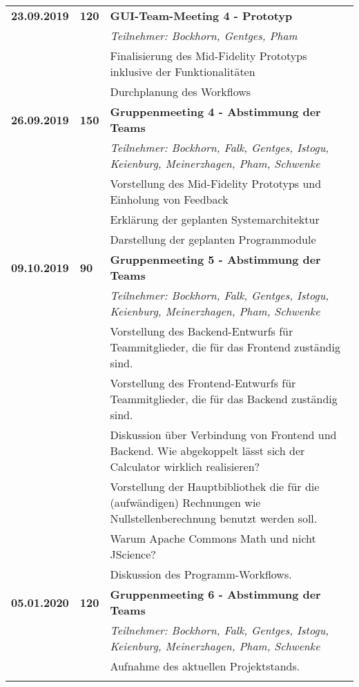 {\begin{longtable}{|l|l|p{11cm}|}
	\\\hline
		\textbf{23.09.2019} 
			& \textbf{\hfill120} & \textbf{GUI-Team-Meeting 4 - Prototyp} 
			\\ & &
			\small{\textit{Teilnehmer: Bockhorn, Gentges, Pham}}
			\\ & &
			Finalisierung des Mid-Fidelity Prototyps inklusive der Funktionalitäten
			\\ & &
			Durchplanung des Workflows			
	\\\hline
		\textbf{26.09.2019} 
			& \textbf{\hfill150} & \textbf{Gruppenmeeting 4 - Abstimmung der Teams}
			\\ & &
			\small{\textit{Teilnehmer: Bockhorn, Falk, Gentges, Istogu, Keienburg, Meinerzhagen, Pham, Schwenke}}
			\\ & &
			Vorstellung des Mid-Fidelity Prototyps und Einholung von Feedback
			\\ & &
			Erklärung der geplanten Systemarchitektur
			\\ & &
			Darstellung der geplanten Programmodule			
	\\\hline
		\textbf{09.10.2019} 
			& \textbf{\hfill90} & \textbf{Gruppenmeeting 5 - Abstimmung der Teams}
			\\ & &
			\small{\textit{Teilnehmer: Bockhorn, Falk, Gentges, Istogu, Keienburg, Meinerzhagen, Pham, Schwenke}}
			\\ & &
			Vorstellung des Backend-Entwurfs für Teammitglieder, die für das Frontend zuständig sind.
			\\ & &
			Vorstellung des Frontend-Entwurfs für Teammitglieder, die für das Backend zuständig sind.
			\\ & &
			Diskussion über Verbindung von Frontend und Backend. Wie abgekoppelt lässt sich der Calculator wirklich realisieren?
			\\ & &
			Vorstellung der Hauptbibliothek die für die (aufwändigen) Rechnungen wie Nullstellenberechnung benutzt werden soll.
			\\ & &
			Warum Apache Commons Math und nicht JScience?
			\\ & &
			Diskussion des Programm-Workflows.
	\\ \hline
		\textbf{05.01.2020} 
			& \textbf{\hfill120} & \textbf{Gruppenmeeting 6 - Abstimmung der Teams}
			\\ & &
			\small{\textit{Teilnehmer: Bockhorn, Falk, Gentges, Istogu, Keienburg, Meinerzhagen, Pham, Schwenke}}
			\\ & &
			Aufnahme des aktuellen Projektstands.
			\\ & &

\end{longtable}}
